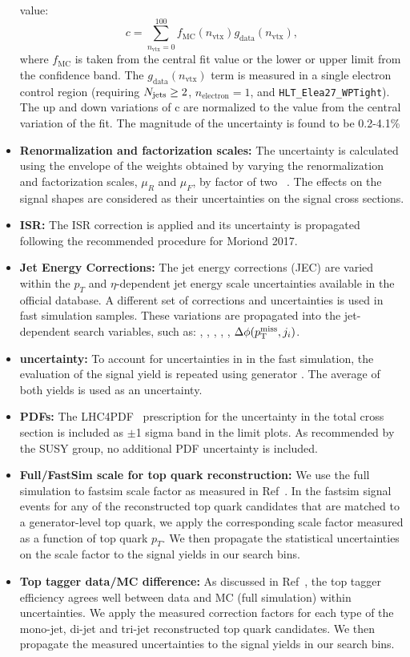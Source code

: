 \begin{itemize}
value:
\begin{equation}
c = \sum_{n_{\text{vtx}}=0}^{100} f_{\text{MC}}(n_{\text{vtx}})g_{\text{data}}(n_{\text{vtx}}) \label{eq:puacc-expval},
\end{equation}
where $f_{\text{MC}}$ is taken from the central fit value or the lower or upper limit from the confidence band.
The $g_{\text{data}}(n_{\text{vtx}})$ term is measured in a single electron control region (requiring $N_{\text{jets}}\geq2$, $n_{\text{electron}}=1$, and \texttt{HLT\_Elea27\_WPTight}).
The up and down variations of c are normalized to the value from the central variation of the fit. The magnitude of the uncertainty is found to be 0.2-4.1\%
\item {\bf Renormalization and factorization scales:} The uncertainty is calculated using the envelope of the weights obtained by varying the renormalization and factorization scales, $\mu_{R}$ and $\mu_{F}$, by factor of two ~\cite{Cacciari:2003fi,Catani:2003zt}. The effects on the signal shapes are considered as their uncertainties on the signal cross sections. %
\item {\bf ISR:} The ISR correction is applied and its uncertainty is propagated following the recommended procedure for Moriond 2017.
\item {\bf Jet Energy Corrections:} The jet energy corrections (JEC) are varied within the $p_{T}$ and $\eta$-dependent jet energy scale uncertainties available in the official database. A different set of corrections and uncertainties is used in fast simulation samples. These variations are propagated into the jet-dependent search variables, such as: \nbjets, \ntops, \MET, \MTTwo, \HT, $\Delta\phi(p^{\rm miss}_{\rm T},j_{i})$.
\item {\bf \MET uncertainty:} To account for uncertainties in \MET in the fast simulation, the evaluation of the signal yield is repeated using generator \MET. The average of both yields is used as an uncertainty.
\item {\bf PDFs:} The LHC4PDF~\cite{Butterworth:2015oua} prescription for the uncertainty in the total cross section is included as $\pm$1 sigma band in the limit plots. As recommended by the SUSY group, no additional PDF uncertainty is included.
\item {\bf Full/FastSim scale for top quark reconstruction:} We use the full simulation to fastsim scale factor as measured in Ref~\cite{AN-16-461}. In the fastsim signal events for any of the reconstructed top quark candidates that are matched to a generator-level top quark, we apply the corresponding scale factor measured as a function of top quark $p_{T}$. We then propagate the statistical uncertainties on the scale factor to the signal yields in our search bins.
\item {\bf Top tagger data/MC difference:} As discussed in Ref~\cite{AN-16-461}, the top tagger efficiency agrees well between data and MC (full simulation) within uncertainties. We apply the measured correction factors for each type of the mono-jet, di-jet and tri-jet reconstructed top quark candidates. We then propagate the measured uncertainties to the signal yields in our search bins.
\end{itemize}

